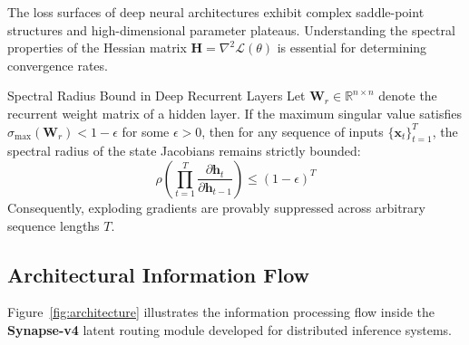 \documentclass[
  11pt,
  a4paper,
  twoside=true,
  headsepline=0.8pt,
  footsepline=false,
  open=right,
  numbers=noenddot,
  chapterprefix=false,
  BCOR=6mm
]{scrbook}
\begin{document}
The loss surfaces of deep neural architectures exhibit complex saddle-point structures and high-dimensional parameter plateaus. Understanding the spectral properties of the Hessian matrix $\mathbf{H} = \nabla^2 \mathcal{L}(\theta)$ is essential for determining convergence rates.

\begin{theorembox}{Spectral Radius Bound in Deep Recurrent Layers}
Let $\mathbf{W}_r \in \mathbb{R}^{n \times n}$ denote the recurrent weight matrix of a hidden layer. If the maximum singular value satisfies $\sigma_{\max}(\mathbf{W}_r) < 1 - \epsilon$ for some $\epsilon > 0$, then for any sequence of inputs $\{\mathbf{x}_t\}_{t=1}^T$, the spectral radius of the state Jacobians remains strictly bounded:
\begin{equation}
  \rho\left(\prod_{t=1}^{T} \frac{\partial \mathbf{h}_t}{\partial \mathbf{h}_{t-1}}\right) \le (1 - \epsilon)^T
\end{equation}
Consequently, exploding gradients are provably suppressed across arbitrary sequence lengths $T$.
\end{theorembox}

\subsection{Architectural Information Flow}

Figure~\ref{fig:architecture} illustrates the information processing flow inside the \textbf{Synapse-v4} latent routing module developed for distributed inference systems.
\end{document}
